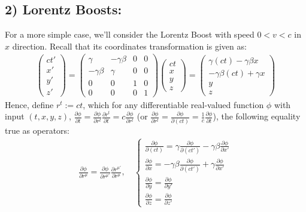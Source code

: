 \documentclass{article}
\begin{document}
\subsection*{2) Lorentz Boosts:}
For a more simple case, we'll consider the Lorentz Boost with speed $0<v<c$ in $x$ direction. Recall that its coordinates transformation is given as:
\begin{align}
    \begin{pmatrix}
        ct'\\x'\\y'\\z'
    \end{pmatrix} = \begin{pmatrix}
        \gamma & -\gamma\beta & 0&0\\
        -\gamma\beta & \gamma &0&0\\
        0&0&1&0\\0&0&0&1
    \end{pmatrix}\begin{pmatrix}
        ct\\x\\y\\z
    \end{pmatrix} = \begin{pmatrix}
        \gamma (ct)-\gamma\beta x\\ -\gamma\beta (ct) + \gamma x\\y\\z
    \end{pmatrix}
\end{align}
Hence, define $r^t := ct$, which for any differentiable real-valued function $\phi$ with input $(t,x,y,z)$, $\frac{\partial \phi}{\partial t}=\frac{\partial\phi}{\partial r^t} \frac{\partial r^t}{\partial t} = c\frac{\partial \phi}{\partial r^t}$ (or $\frac{\partial \phi}{\partial r^t}=\frac{\partial\phi}{\partial (ct)}=\frac{1}{c}\frac{\partial\phi}{\partial t}$), the following equality true as operators:
\begin{align}
    \frac{\partial\phi}{\partial r^\mu} = \frac{\partial\phi}{\partial r^{\mu'}}\frac{\partial r^{\mu'}}{\partial r^\mu},\quad \begin{cases}
        \frac{\partial\phi}{\partial (ct)} = \gamma\frac{\partial\phi}{\partial (ct')}-\gamma\beta\frac{\partial\phi}{\partial x'}\\
        \frac{\partial \phi}{\partial x} = -\gamma\beta\frac{\partial \phi}{\partial (ct')} + \gamma\frac{\partial\phi}{\partial x'}\\
        \frac{\partial\phi}{\partial y} = \frac{\partial\phi}{\partial y'}\\
        \frac{\partial\phi}{\partial z} = \frac{\partial\phi}{\partial z'}
    \end{cases}
\end{align}
\end{document}

